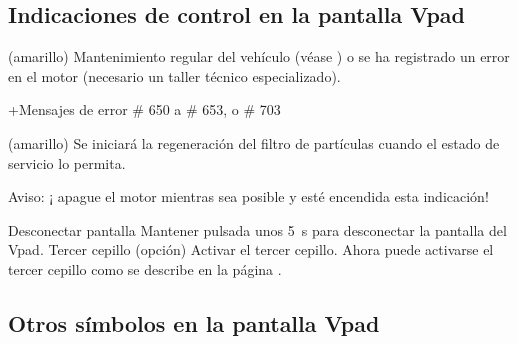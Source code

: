 \setupparagraphs [SymVpad][1][width=4em,inner=\hfill]


\subsection{Indicaciones de control en la pantalla Vpad} %


\startSymVpad
\externalfigure[vpadWarningService][height=1.7\lH]
\SymVpad
{}(amarillo) Mantenimiento regular del vehículo (véase  ) o se ha registrado un error en el motor (necesario un taller técnico especializado).

+\:Mensajes de error \# 650 a \# 653, o \# 703
\stopSymVpad


\startSymVpad
\externalfigure[vpadTDPF][height=1.7\lH]
\SymVpad
{}(amarillo) Se iniciará la regeneración del filtro de partículas cuando el estado de servicio lo permita.

{\md Aviso:} {\lt ¡{\emNo} apague el motor mientras sea posible y esté encendida esta indicación!}
\stopSymVpad





\bTR\bTD {} \eTD\bTD Desconectar pantalla \eTD\bTD Mantener pulsada unos 5 s para desconectar la pantalla del Vpad. \eTD\eTR
\bTR\bTD {}
\eTD\bTD Tercer cepillo (opción) \eTD\bTD Activar el tercer cepillo.
Ahora puede activarse el tercer cepillo como se describe en la página . \eTD\eTR



\startsection [title={Los menús del Vpad}, reference={vpad:menu}]



\subsection{Otros símbolos en la pantalla Vpad}




